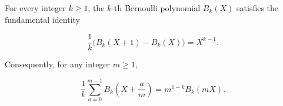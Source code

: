 For every integer $k \geq 1$, the $k$-th Bernoulli polynomial $B_k(X)$ satisfies the fundamental identity

$$
\frac{1}{k}\bigl(B_k(X+1) - B_k(X)\bigr) = X^{k-1}.
$$

Consequently, for any integer $m \geq 1$,

$$
\frac{1}{k}\sum_{a=0}^{m-1} B_k\!\left(X + \frac{a}{m}\right) = m^{1-k} B_k(mX).
$$
